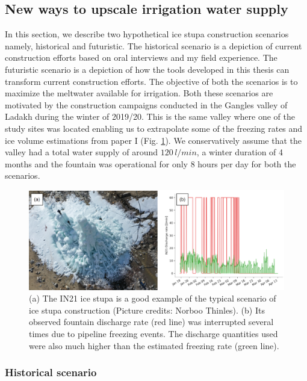 \subsection{New ways to upscale irrigation water supply}

In this section, we describe two hypothetical ice stupa construction scenarios namely, historical and
futuristic. The historical scenario is a depiction of current construction efforts based on oral interviews and
my field experience. The futuristic scenario is a depiction of how the tools developed in this thesis can
transform current construction efforts. The objective of both the scenarios is to maximize the meltwater
available for irrigation. Both these scenarios are motivated by the construction campaigns conducted in the
Gangles valley of Ladakh during the winter of 2019/20. This is the same valley where one of the study sites was
located enabling us to extrapolate some of the freezing rates and ice volume estimations from paper I (Fig.
\ref{fig:gangles_data}). We conservatively assume that the valley had a total water supply of around
$120\,l/min$, a winter duration of 4 months and the fountain was operational for only 8 hours per day for both
the scenarios. 

\begin{figure}[htb]
	\includegraphics[width=\textwidth]{figs/gangles_data}

  \caption{(a) The IN21 ice stupa is a good example of the typical scenario of ice stupa construction (Picture
  credits: Norboo Thinles). (b) Its observed fountain discharge rate (red line) was interrupted several times
  due to pipeline freezing events. The discharge quantities used were also much higher than the estimated
  freezing rate (green line). }

	\label{fig:gangles_data}
\end{figure}

\subsubsection{Historical scenario}

